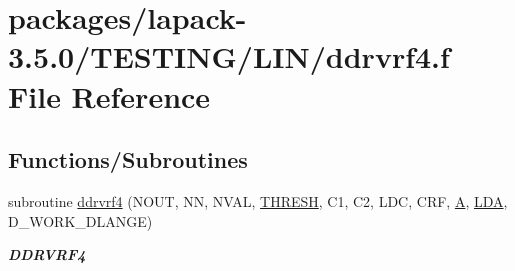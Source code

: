\hypertarget{ddrvrf4_8f}{}\section{packages/lapack-\/3.5.0/\+T\+E\+S\+T\+I\+N\+G/\+L\+I\+N/ddrvrf4.f File Reference}
\label{ddrvrf4_8f}
\subsection*{Functions/\+Subroutines}
\begin{DoxyCompactItemize}
\item 
subroutine \hyperlink{group__double__lin_gada81e7735e21ac0cc4206dd23ba45ecd}{ddrvrf4} (N\+O\+U\+T, N\+N, N\+V\+A\+L, \hyperlink{zlaqgs_8c_a0656018abfc9fa2821827415f5d5ea57}{T\+H\+R\+E\+S\+H}, C1, C2, L\+D\+C, C\+R\+F, \hyperlink{classA}{A}, \hyperlink{example__user_8c_ae946da542ce0db94dced19b2ecefd1aa}{L\+D\+A}, D\+\_\+\+W\+O\+R\+K\+\_\+\+D\+L\+A\+N\+G\+E)
\begin{DoxyCompactList}\small\item\em {\bfseries D\+D\+R\+V\+R\+F4} \end{DoxyCompactList}\end{DoxyCompactItemize}
